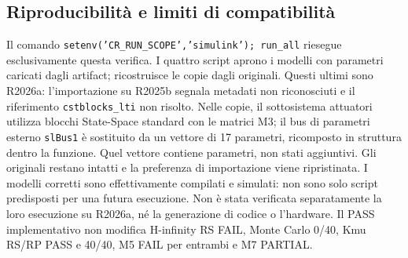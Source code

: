 \subsection{Riproducibilità e limiti di compatibilità}
Il comando \texttt{setenv('CR\_RUN\_SCOPE','simulink'); run\_all}
riesegue esclusivamente questa verifica. I quattro script
 aprono i modelli con parametri caricati dagli
artifact;  ricostruisce le copie dagli originali.
Questi ultimi sono R2026a: l'importazione su R2025b segnala metadati non
riconosciuti e il riferimento \texttt{cstblocks\_lti} non risolto.
Nelle copie, il sottosistema attuatori utilizza blocchi State-Space standard
con le matrici M3; il bus di parametri esterno \texttt{slBus1} è sostituito da
un vettore di 17 parametri, ricomposto in struttura dentro la funzione.
Quel vettore contiene parametri, non stati aggiuntivi.
Gli originali restano intatti e la preferenza di importazione viene ripristinata.
I modelli corretti sono effettivamente compilati e simulati: non sono solo
script predisposti per una futura esecuzione. Non è stata verificata
separatamente la loro esecuzione su R2026a, né la generazione di codice o
l'hardware. Il PASS implementativo non modifica H-infinity RS FAIL,
Monte Carlo 0/40, Kmu RS/RP PASS e 40/40, M5 FAIL per entrambi e M7 PARTIAL.


